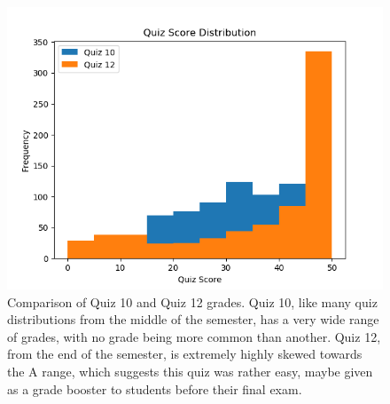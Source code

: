 \documentclass[12pt,letterpaper]{article}
\begin{document}
\begin{figure}[!htb]
  \includegraphics[width=\linewidth]{graph9.png}
  \caption{Comparison of Quiz 10 and Quiz 12 grades. Quiz 10, like many quiz distributions from the middle of the semester, has a very wide range of grades, with no grade being more common than another. Quiz 12, from the end of the semester, is extremely highly skewed towards the A range, which suggests this quiz was rather easy, maybe given as a grade booster to students before their final exam.}
\end{figure}
\end{document}
